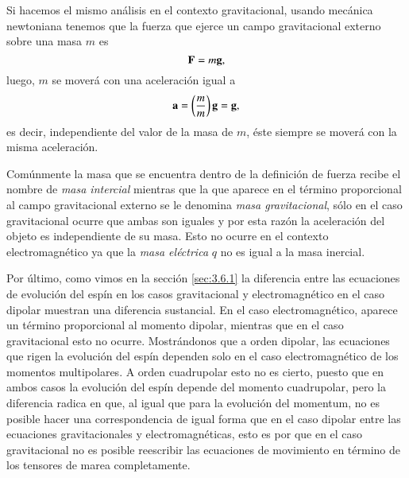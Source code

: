 Si hacemos el mismo análisis en el contexto gravitacional, usando mecánica newtoniana tenemos que la fuerza que ejerce un campo gravitacional externo sobre una masa $m$ es
\begin{equation}
\label{eq:67}
\vb{F} = m \vb{g},
\end{equation}
luego, $m$ se moverá con una aceleración igual a
\begin{equation}
\vb{a} = \left( \frac{m}{m} \right) \vb{g} = \vb{g},
\end{equation}
es decir, independiente del valor de la masa de $m$, éste siempre se moverá con la misma aceleración. 

Comúnmente la masa que se encuentra dentro de la definición de fuerza recibe el nombre de \textit{masa intercial} mientras que la que aparece en el término proporcional al campo gravitacional externo se le denomina \textit{masa gravitacional}, sólo en el caso gravitacional ocurre que ambas son iguales y por esta razón la aceleración del objeto es independiente de su masa. Esto no ocurre en el contexto electromagnético ya que la \textit{masa eléctrica} $q$ no es igual a la masa inercial.

Por último, como vimos en la sección \ref{sec:3.6.1} la diferencia entre las ecuaciones de evolución del espín en los casos gravitacional y electromagnético en el caso dipolar muestran una diferencia sustancial. En el caso electromagnético, aparece un término proporcional al momento dipolar, mientras que en el caso gravitacional esto no ocurre. Mostrándonos que a orden dipolar, las ecuaciones que rigen la evolución del espín dependen solo en el caso electromagnético de los momentos multipolares. A orden cuadrupolar esto no es cierto, puesto que en ambos casos la evolución del espín depende del momento cuadrupolar, pero la diferencia radica en que, al igual que para la evolución del momentum, no es posible hacer una correspondencia de igual forma que en el caso dipolar entre las ecuaciones gravitacionales y electromagnéticas, esto es por que en el caso gravitacional no es posible reescribir las ecuaciones de movimiento en término de los tensores de marea completamente.